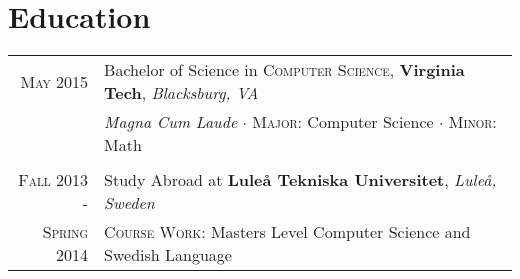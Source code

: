 \documentclass[letterpaper,10pt]{article}
\begin{document}

\section{Education}
\begin{tabular}{R|B}
	\textsc{May} 2015                & Bachelor of Science in \textsc{Computer Science}, \textbf{Virginia Tech}, \emph{Blacksburg, VA}    \\
	                                 & \small\emph{Magna Cum Laude} $\cdot$ \textsc{Major}: Computer Science $\cdot$ \textsc{Minor}: Math \\
	                                                                                                                  \\

	\textsc{Fall} 2013 -             & Study Abroad at \textbf{Luleå Tekniska Universitet}, \emph{Luleå, Sweden}                          \\
	\textsc{Spring} 2014\phantom{ -} & \small\textsc{Course Work}: Masters Level Computer Science and Swedish Language
\end{tabular}
\end{document}
